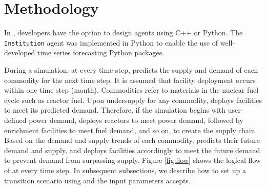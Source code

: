 \section{Methodology}
In \Cyclus, developers have the option to design 
agents using C++ or Python. 
The \deploy \texttt{Institution} agent was 
implemented in Python to enable the use of 
well-developed time series forecasting Python packages. 

During a \Cyclus simulation, at every time step, \deploy 
predicts the supply and demand of each commodity for the next time 
step. 
It is assumed that facility deployment occurs 
within one time step (month). 
Commodities refer to materials in the nuclear fuel cycle such as 
reactor fuel. 
Upon undersupply for any commodity, 
\deploy deploys facilities to meet its predicted demand.
Therefore, if the simulation begins with user-defined power 
demand, \deploy deploys reactors to meet power demand, 
followed by enrichment facilities to meet fuel demand, and so on,
to create the supply chain.
Based on the demand and supply trends of each commodity, 
\deploy predicts their 
future demand and supply, and deploys facilities 
accordingly to meet the future demand to prevent demand 
from surpassing supply. 
Figure \ref{fig:flow} shows the logical flow of \deploy 
at every time step. 
In subsequent subsections, we describe how to set up a 
transition scenario using \deploy and the input parameters 
\deploy accepts. 


